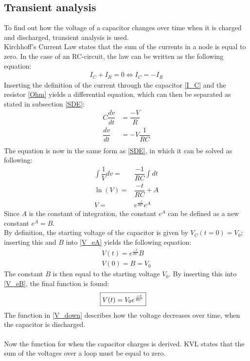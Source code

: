 \subsection{Transient analysis}
\label{sec371}
To find out how the voltage of a capacitor changes over time when it is charged and discharged, transient analysis is used.
\\
Kirchhoff's Current Law states that the sum of the currents in a node is equal to zero. In the case of an RC-circuit, the law can be written as the following equation:
\begin{align*}
I_{C}+I_{R}=0 \Leftrightarrow 
I_{C}= -I_{R}
\end{align*}
Inserting the definition of the current through the capacitor \eqref{I_C} and the resistor \eqref{Ohm} yields a differential equation, which can then be separated as stated in subsection \ref{SDE}:
\begin{align*}
C \dfrac{dv}{dt}&=\dfrac{-V}{R} \\
\dfrac{dv}{dt} &= -V\dfrac{1}{RC} \\
\end{align*}
The equation is now in the same form as \eqref{SDE}, in which it can be solved as following:
\begin{align}
\int \dfrac{1}{V}dv =& \dfrac{-1}{RC} \int dt\nonumber \\
\ln(V) =& \dfrac{-t}{RC} + A \nonumber\\
V =& e^{\frac{-t}{RC}}e^{A}\label{V_eA}
\end{align}
Since $A$ is the constant of integration, the constant $e^A$ can be defined as a new constant $e^A=B$.
\\
By definition, the starting voltage of the capacitor is given by $V_C(t=0)=V_0$; inserting this and $B$ into \eqref{V_eA} yields the following equation: 
\begin{align}
V(t)= e^{\frac{-t}{RC}}B \label{V_eB}\\
V(0)= B = V_0\nonumber
\end{align}
The constant $B$ is then equal to the starting voltage $V_0$. By inserting this into \eqref{V_eB}, the final function is found:
\begin{align}
\label{V_down}
\Aboxed{
 V(t) = V_0e^{\frac{-t}{RC}}
 }
\end{align}
The function in \eqref{V_down} describes how the voltage decreases over time, when the capacitor is discharged.
\\
\\
Now the function for when the capacitor charges is derived. KVL states that the sum of the voltages over a loop must be equal to zero. 
